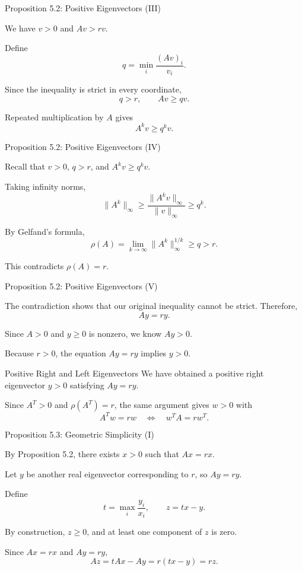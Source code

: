 \begin{frame}{Proposition 5.2: Positive Eigenvectors (III)}
\small

We have $v>0$ and $Av>rv$.

Define
\[
q=\min_i\frac{(Av)_i}{v_i}.
\]

Since the inequality is strict in every
coordinate,
\[
q>r,\qquad Av\geq qv.
\]


Repeated multiplication by $A$ gives
\[
A^kv\geq q^kv.
\]
\end{frame}

\begin{frame}{Proposition 5.2: Positive Eigenvectors (IV)}
\small

Recall that $v>0$, $q>r$, and $A^kv\geq q^kv$.

Taking infinity norms,
\[
\|A^k\|_\infty
\geq
\frac{\|A^kv\|_\infty}{\|v\|_\infty}
\geq q^k.
\]

By Gelfand's formula,
\[
\rho(A)=\lim_{k\to\infty}
\|A^k\|_\infty^{1/k}\geq q>r.
\]

This contradicts $\rho(A)=r$.
\end{frame}

\begin{frame}{Proposition 5.2: Positive Eigenvectors (V)}
\small

The contradiction shows that our
original inequality cannot be strict.
Therefore,
\[
Ay=ry.
\]

Since $A>0$ and $y\geq0$ is nonzero,
we know $Ay>0$.

Because $r>0$, the equation $Ay=ry$
implies $y>0$.

\begin{block}{Positive Right and Left Eigenvectors}
We have obtained a positive right
eigenvector $y>0$ satisfying $Ay=ry$.

Since $A^T>0$ and $\rho(A^T)=r$,
the same argument gives $w>0$ with
\[
A^Tw=rw
\quad\Longleftrightarrow\quad
w^TA=rw^T.
\]
\end{block}
\end{frame}

\begin{frame}{Proposition 5.3: Geometric Simplicity (I)}
\small

By Proposition 5.2, there exists $x>0$
such that $Ax=rx$.

Let $y$ be another real eigenvector
corresponding to $r$, so $Ay=ry$.

Define
\[
t=\max_i\frac{y_i}{x_i},
\qquad z=tx-y.
\]

By construction, $z\geq0$, and at least
one component of $z$ is zero.

Since $Ax=rx$ and $Ay=ry$,
\[
Az=tAx-Ay=r(tx-y)=rz.
\]
\end{frame}

